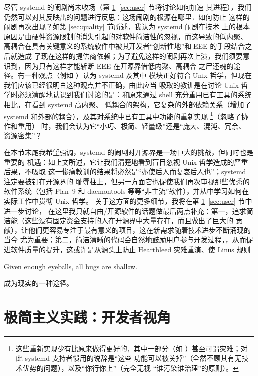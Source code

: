 尽管 systemd 的闹剧尚未收场（第 \ref{sec:devel}--\ref{sec:user} 节将讨论如何加速
其进程），我们仍然可以对其反映出的问题进行反思：这场闹剧的根源在哪里，如何防止
这样的闹剧再次出现？如第 \ref{sec:quality} 节所述，我认为 systemd 闹剧在技术
上的根本原因是由硬件资源限制的消失引起的对软件简洁性的忽视，而这导致的低内聚、
高耦合在具有关键意义的系统软件中被其开发者“创新性地”和 EEE 的手段结合之后就造成
了现在这样的提供商依赖；为了避免这样的闹剧再次上演，我们须要意识到，因为只有这样才能斩断 EEE 在开源界借低内聚、高耦合
之尸还魂的途径。有一种观点（例如 \parencite{bugaev2016}）认为 systemd 及其中
模块正好符合 Unix 哲学，但现在我们应该已经很明白这种观点并不正确，由此应当
吸取的教训是在讨论 Unix 哲学时必须清醒地认识到我们讨论的是：和原来通过 shell 充分重用已有工具的系统相比，在看到 systemd 高内聚、
低耦合的架构，它复杂的外部依赖关系（增加了 systemd
和外部的耦合），及其对系统中已有工具中功能的重新实现%
\footnote{这些重新实现少有比原来做得更好的，其中一部分（如 \parencite%
{wouters2016, david2018}）甚至可谓灾难；对此 systemd 支持者惯用的说辞是“这些
功能可以被关掉”（全然不顾其有无技术优势的问题），以及“你行你上”（完全无视
“谁污染谁治理”的原则）。}（忽略了协作和重用）
时，我们会认为它“小巧、极简、轻量级”还是“庞大、混沌、冗余、
资源密集”？

在本节末尾我希望强调，systemd 的闹剧对开源界是一场巨大的挑战，但同时也是重要的
机遇：如上文所述，它让我们清楚地看到盲目忽视 Unix 哲学造成的严重后果，不吸取
这一惨痛教训的结果将必然是“亦使后人而复哀后人也”；systemd 注定要被钉在开源界的
耻辱柱上，但另一方面它也促使我们再次审视那些优秀的软件系统（包括 Plan~9 和
daemontools 等等“非主流”软件），并从中学习如何在实际工作中贯彻 Unix 哲学。
关于这方面的更多细节，我将在第 \ref{sec:devel}--\ref{sec:user} 节中进一步讨论，
在这里我只就自由/开源软件的话题做最后两点补充：第一，追求简洁能（这些没有固定资金支持的人在开源界中大量存在，而且做出了巨大的
贡献），让他们更容易专注于最有意义的项目，这在新需求随着技术进步不断涌现的当今
尤为重要；第二，简洁清晰的代码会自然地鼓励用户参与开发过程，，从而促进软件质量的提升，这或许是从源头上防止
Heartbleed 灾难重演、使 Linus 规则
\begin{quoting}
	Given enough eyeballs, all bugs are shallow.
\end{quoting}
成为现实的一种途径。

\section{极简主义实践：开发者视角}\label{sec:devel}

